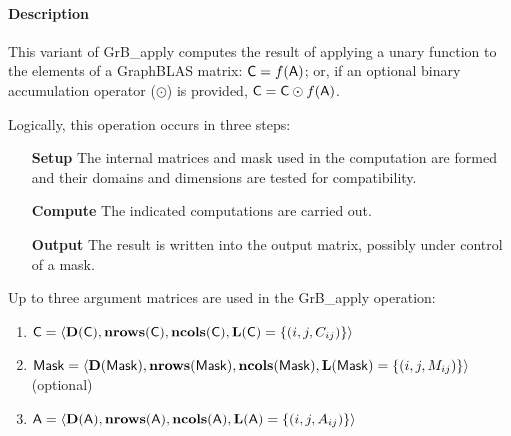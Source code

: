\paragraph{Description}

This variant of {\sf GrB\_apply} computes the result of applying a unary function
to the elements of a 
GraphBLAS matrix: ${\sf C} = f({\sf A})$; or, if an 
optional binary accumulation operator ($\odot$) is provided, 
${\sf C} = {\sf C} \odot f({\sf A})$.  

Logically, this operation occurs in three steps:
\begin{enumerate}[leftmargin=0.85in]
\item[\bf Setup] The internal matrices and mask used in the computation are formed 
and their domains and dimensions are tested for compatibility.
\item[\bf Compute] The indicated computations are carried out.
\item[\bf Output] The result is written into the output matrix, possibly under 
control of a mask.
\end{enumerate}

Up to three argument matrices are used in the {\sf GrB\_apply} operation:
\begin{enumerate}
	\item ${\sf C} = \langle \bold{D}({\sf C}),\bold{nrows}({\sf C}),
    \bold{ncols}({\sf C}),\bold{L}({\sf C}) = \{(i,j,C_{ij}) \} \rangle$

	\item ${\sf Mask} = \langle \bold{D}({\sf Mask}),\bold{nrows}({\sf Mask}),
    \bold{ncols}({\sf Mask}),\bold{L}({\sf Mask}) = \{(i,j,M_{ij}) \} \rangle$ (optional)

	\item ${\sf A} = \langle \bold{D}({\sf A}),\bold{nrows}({\sf A}),
    \bold{ncols}({\sf A}),\bold{L}({\sf A}) = \{(i,j,A_{ij}) \} \rangle$
\end{enumerate}

